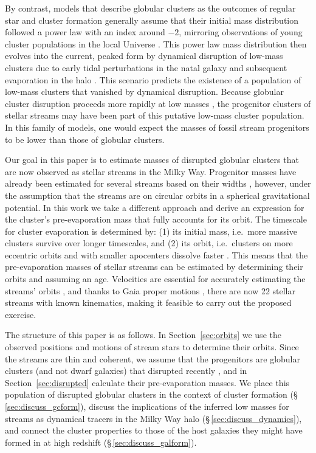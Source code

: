 \documentclass[twocolumn]{aastex63}
\begin{document}
By contrast, models that describe globular clusters as the outcomes of regular star and cluster formation generally assume that their initial mass distribution followed a power law with an index around $-2$, mirroring observations of young cluster populations in the local Universe \citep[e.g.,][]{larsen:2009,adamo:2020}.
This power law mass distribution then evolves into the current, peaked form by dynamical disruption of low-mass clusters due to early tidal perturbations in the natal galaxy and subsequent evaporation in the halo \citep{elmegreen:1997,fall:2001,elmegreen:2010,kruijssen15b}.
This scenario predicts the existence of a population of low-mass clusters that vanished by dynamical disruption.
Because globular cluster disruption proceeds more rapidly at low masses \citep{baumgardt03,krumholz:2019}, the progenitor clusters of stellar streams may have been part of this putative low-mass cluster population.
In this family of models, one would expect the masses of fossil stream progenitors to be lower than those of globular clusters.

Our goal in this paper is to estimate masses of disrupted globular clusters that are now observed as stellar streams in the Milky Way.
Progenitor masses have already been estimated for several streams based on their widths \citep{erkal:2016b, erkal:2016, shipp:2018}, however, under the assumption that the streams are on circular orbits in a spherical gravitational potential.
In this work we take a different approach and derive an expression for the cluster's pre-evaporation mass that fully accounts for its orbit.
The timescale for cluster evaporation is determined by: (1) its initial mass, i.e.\ more massive clusters survive over longer timescales, and (2) its orbit, i.e.\ clusters on more eccentric orbits and with smaller apocenters dissolve faster \citep{baumgardt03,kruijssen09}.
This means that the pre-evaporation masses of stellar streams can be estimated by determining their orbits and assuming an age.
Velocities are essential for accurately estimating the streams' orbits \citep{bh:2018}, and thanks to Gaia proper motions \citep{gdr2}, there are now 22 stellar streams with known kinematics, making it feasible to carry out the proposed exercise.

The structure of this paper is as follows.
In Section~\ref{sec:orbits} we use the observed positions and motions of stream stars to determine their orbits.
Since the streams are thin and coherent, we assume that the progenitors are globular clusters (and not dwarf galaxies) that disrupted recently \citep{helmi:2003}, and in Section~\ref{sec:disrupted} calculate their pre-evaporation masses.
We place this population of disrupted globular clusters in the context of cluster formation (\S\,\ref{sec:discuss_gcform}), discuss the implications of the inferred low masses for streams as dynamical tracers in the Milky Way halo (\S\,\ref{sec:discuss_dynamics}), and connect the cluster properties to those of the host galaxies they might have formed in at high redshift (\S\,\ref{sec:discuss_galform}).
\end{document}
